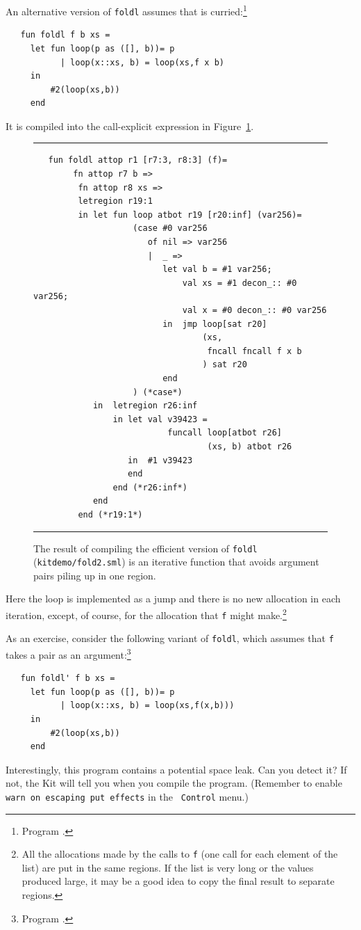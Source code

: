 \documentclass[12pt]{book}
\begin{document}
An alternative version of {\tt foldl} assumes that 
is curried:\footnote{Program .}
\begin{verbatim}
   fun foldl f b xs = 
     let fun loop(p as ([], b))= p
           | loop(x::xs, b) = loop(xs,f x b)
     in
         #2(loop(xs,b))
     end
\end{verbatim}
It is compiled into the call-explicit expression in
Figure~\ref{fold2.fig}.
\begin{figure}
\hrule \medskip
\begin{verbatim}
   fun foldl attop r1 [r7:3, r8:3] (f)= 
        fn attop r7 b => 
         fn attop r8 xs => 
         letregion r19:1 
         in let fun loop atbot r19 [r20:inf] (var256)= 
                    (case #0 var256 
                       of nil => var256
                       |  _ => 
                          let val b = #1 var256; 
                              val xs = #1 decon_:: #0 var256; 
                              val x = #0 decon_:: #0 var256
                          in  jmp loop[sat r20] 
                                  (xs, 
                                   fncall fncall f x b
                                  ) sat r20
                          end 
                    ) (*case*) 
            in  letregion r26:inf 
                in let val v39423 = 
                           funcall loop[atbot r26] 
                                   (xs, b) atbot r26
                   in  #1 v39423
                   end  
                end (*r26:inf*)
            end  
         end (*r19:1*)
\end{verbatim}
\caption{The result of compiling the efficient version of {\tt foldl} 
  ({\tt kitdemo/fold2.sml}) is an iterative function that avoids
  argument pairs piling up in one region.}  \medskip \hrule
\label{fold2.fig}
\end{figure}
Here the loop is implemented as a jump and there is no new allocation
in each iteration, except, of course, for the allocation that {\tt f}
might make.\footnote{All the allocations made by the calls to {\tt f}
  (one call for each element of the list) are put in the same regions.
  If the list is very long or the values produced large, it may be a
  good idea to copy the final result to separate regions.}

As an exercise, consider the following variant of {\tt foldl}, which
assumes that {\tt f} takes a pair as an argument:\footnote{Program
  .}
\begin{verbatim}
   fun foldl' f b xs = 
     let fun loop(p as ([], b))= p
           | loop(x::xs, b) = loop(xs,f(x,b)))
     in
         #2(loop(xs,b))
     end
\end{verbatim}
Interestingly, this program contains a potential space leak. Can you
detect it? If not, the Kit will tell you when you compile the program.
(Remember to enable {\tt warn on escaping put effects} in the {\tt
  Control} menu.)
\end{document}
